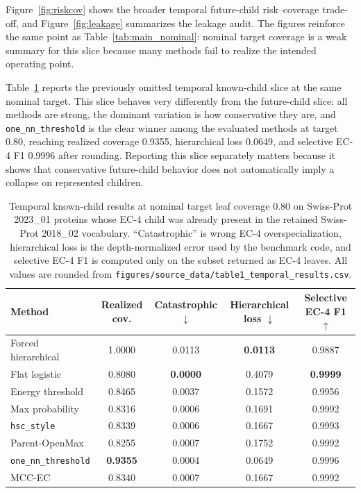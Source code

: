 \documentclass{article}
\newcommand{\method}{MCC-EC\xspace}
\begin{document}
Figure~\ref{fig:riskcov} shows the broader temporal future-child risk--coverage trade-off, and Figure~\ref{fig:leakage} summarizes the leakage audit. The figures reinforce the same point as Table~\ref{tab:main_nominal}: nominal target coverage is a weak summary for this slice because many methods fail to realize the intended operating point.

Table~\ref{tab:known80} reports the previously omitted temporal known-child slice at the same nominal target. This slice behaves very differently from the future-child slice: all methods are strong, the dominant variation is how conservative they are, and \texttt{one\_nn\_threshold} is the clear winner among the evaluated methods at target 0.80, reaching realized coverage 0.9355, hierarchical loss 0.0649, and selective EC-4 F1 0.9996 after rounding. Reporting this slice separately matters because it shows that conservative future-child behavior does not automatically imply a collapse on represented children.

\begin{table}[t]
\caption{Temporal known-child results at nominal target leaf coverage 0.80 on Swiss-Prot 2023\_01 proteins whose EC-4 child was already present in the retained Swiss-Prot 2018\_02 vocabulary. ``Catastrophic'' is wrong EC-4 overspecialization, hierarchical loss is the depth-normalized error used by the benchmark code, and selective EC-4 F1 is computed only on the subset returned as EC-4 leaves. All values are rounded from \texttt{figures/source\_data/table1\_temporal\_results.csv}.}
\label{tab:known80}
\centering
\small
\begin{tabular}{lcccc}
\toprule
Method & Realized cov. & Catastrophic $\downarrow$ & Hierarchical loss $\downarrow$ & Selective EC-4 F1 $\uparrow$ \\
\midrule
Forced hierarchical & 1.0000 & 0.0113 & \textbf{0.0113} & 0.9887 \\
Flat logistic & 0.8080 & \textbf{0.0000} & 0.4079 & \textbf{0.9999} \\
Energy threshold & 0.8465 & 0.0037 & 0.1572 & 0.9956 \\
Max probability & 0.8316 & 0.0006 & 0.1691 & 0.9992 \\
\texttt{hsc\_style} & 0.8339 & 0.0006 & 0.1667 & 0.9993 \\
Parent-OpenMax & 0.8255 & 0.0007 & 0.1752 & 0.9992 \\
\texttt{one\_nn\_threshold} & \textbf{0.9355} & 0.0004 & 0.0649 & 0.9996 \\
\method & 0.8340 & 0.0007 & 0.1667 & 0.9992 \\
\bottomrule
\end{tabular}
\end{table}
\end{document}
